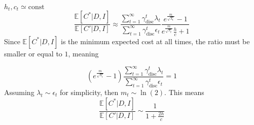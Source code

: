 $h_t,c_t\simeq \text{const}$
\begin{equation}
		\frac{\mathbb{E}[C^*|D,I] }{\mathbb{E}[C'|D,I]}\approx \frac{\sum_{t=1}^{\infty} \gamma_{\text{disc}}^{t} \lambda_t}{\sum_{t=1}^{\infty} \gamma_{\text{disc}}^{t} \epsilon_t}\frac{e^{\frac{m}{\sqrt{\lambda_t}}}-1}{e^{\frac{m}{\sqrt{\lambda_t}}}\frac{h}{c}+1}
\end{equation}
Since $\mathbb{E}[C^*|D,I]$ is the minimum expected cost at all times, the ratio must be smaller or equal to $1$, meaning

\begin{equation}
	(e^{\frac{m}{\sqrt{\lambda_t}}}-1)\frac{\sum_{t=1}^{\infty} \gamma_{\text{disc}}^{t} \lambda_t}{\sum_{t=1}^{\infty} \gamma_{\text{disc}}^{t} \epsilon_t}=1
\end{equation}
Assuming $\lambda_t\sim \epsilon_t$ for simplicity, then $m_t\sim \ln(2)$. This means
\begin{equation}
	\frac{\mathbb{E}[C^*|D,I] }{\mathbb{E}[C'|D,I]}\sim \frac{1}{1+\frac{2h}{c}}
\end{equation}

